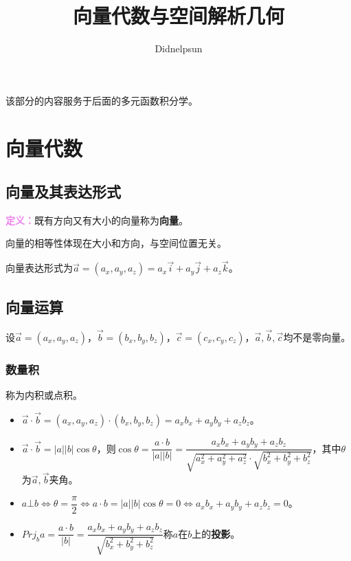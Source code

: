 \documentclass[UTF8, 12pt]{ctexart}
\author{Didnelpsun}
\title{向量代数与空间解析几何}
\date{}
\begin{document}
\maketitle
\pagestyle{empty}
\thispagestyle{empty}
\tableofcontents
\thispagestyle{empty}
\newpage
\pagestyle{plain}
\setcounter{page}{1}

该部分的内容服务于后面的多元函数积分学。

\section{向量代数}

\subsection{向量及其表达形式}

\textcolor{violet}{\textbf{定义：}}既有方向又有大小的向量称为\textbf{向量}。

向量的相等性体现在大小和方向，与空间位置无关。

向量表达形式为$\vec{a}=(a_x,a_y,a_z)=a_x\vec{i}+a_y\vec{j}+a_z\vec{k}$。

\subsection{向量运算}

设$\vec{a}=(a_x,a_y,a_z)$，$\vec{b}=(b_x,b_y,b_z)$，$\vec{c}=(c_x,c_y,c_z)$，$\vec{a},\vec{b},\vec{c}$均不是零向量。

\subsubsection{数量积}

称为内积或点积。

\begin{itemize}
    \item $\vec{a}\cdot\vec{b}=(a_x,a_y,a_z)\cdot(b_x,b_y,b_z)=a_xb_x+a_yb_y+a_zb_z$。
    \item $\vec{a}\cdot\vec{b}=\vert a\vert\vert b\vert\cos\theta$，则$\cos\theta=\dfrac{a\cdot b}{\vert a\vert\vert b\vert}=\dfrac{a_xb_x+a_yb_y+a_zb_z}{\sqrt{a_x^2+a_y^2+a_z^2}\cdot\sqrt{b_x^2+b_y^2+b_z^2}}$，其中$\theta$为$\vec{a},\vec{b}$夹角。
    \item $a\bot b\Leftrightarrow\theta=\dfrac{\pi}{2}\Leftrightarrow a\cdot b=\vert a\vert\vert b\vert\cos\theta=0\Leftrightarrow a_xb_x+a_yb_y+a_zb_z=0$。
    \item $Prj_ba=\dfrac{a\cdot b}{\vert b\vert}=\dfrac{a_xb_x+a_yb_y+a_zb_z}{\sqrt{b_x^2+b_y^2+b_z^2}}$称$a$在$b$上的\textbf{投影}。
\end{itemize}
\end{document}
